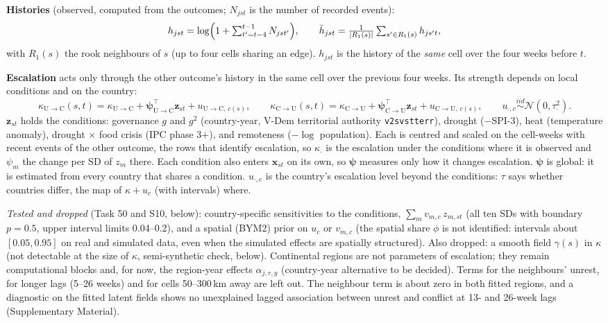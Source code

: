 \documentclass[10pt]{article}
\newcommand{\N}{\mathcal{N}}
\newcommand{\C}{\mathrm{C}}
\newcommand{\U}{\mathrm{U}}
\begin{document}
\textbf{Histories} (observed, computed from the outcomes; $N_{jst}$ is the number of recorded events):
\[
h_{jst} = \log\Bigl(1 + \textstyle\sum_{t'=t-4}^{t-1} N_{jst'}\Bigr), \qquad
\bar h_{jst} = \frac{1}{|R_1(s)|}\sum_{s' \in R_1(s)} h_{js't},
\]
with $R_1(s)$ the rook neighbours of $s$ (up to four cells sharing an edge). $h_{jst}$ is the history
of the \emph{same} cell over the four weeks before $t$.

\textbf{Escalation} acts only through the other outcome's history in the same cell over the previous
four weeks. Its strength depends on local conditions and on the country:
\[
\kappa_{\U\to\C}(s,t) = \kappa_{\U\to\C} + \bm\psi_{\U\to\C}^\top \bm z_{st} + u_{\U\to\C,\,c(s)}, \qquad
\kappa_{\C\to\U}(s,t) = \kappa_{\C\to\U} + \bm\psi_{\C\to\U}^\top \bm z_{st} + u_{\C\to\U,\,c(s)},
\qquad u_{\cdot,c} \overset{iid}{\sim} \N(0, \tau^2_{\cdot}).
\]
$\bm z_{st}$ holds the conditions: governance $g$ and $g^2$ (country-year, V-Dem territorial authority
\texttt{v2svstterr}), drought ($-$SPI-3), heat (temperature anomaly), drought $\times$ food crisis (IPC phase 3+), and
remoteness ($-\log$ population). Each is centred and scaled on the cell-weeks with recent events of the other outcome,
the rows that identify escalation, so $\kappa_{\cdot}$ is the escalation under the conditions where it is observed and
$\psi_m$ the change per SD of $z_m$ there. Each condition also enters $\bm x_{st}$ on its own, so $\bm\psi$ measures
only how it changes escalation. $\bm\psi$ is global: it is estimated from every country that shares a condition.
$u_{\cdot,c}$ is the country's escalation level beyond the conditions: $\tau$ says whether countries differ, the map of
$\kappa + u_c$ (with intervals) where.

\emph{Tested and dropped} (Task 50 and S10, below): country-specific sensitivities to the conditions,
$\sum_m v_{m,c}\, z_{m,st}$ (all ten SDs with boundary $p = 0.5$, upper interval limits 0.04--0.2), and a spatial
(BYM2) prior on $u_c$ or $v_{m,c}$ (the spatial share $\phi$ is not identified: intervals about $[0.05, 0.95]$ on real
and simulated data, even when the simulated effects are spatially structured). Also dropped: a smooth field
$\gamma(s)$ in $\kappa$ (not detectable at the size of $\kappa$, semi-synthetic check, below). Continental regions are
not parameters of escalation; they remain computational blocks and, for now, the region-year effects
$\alpha_{j,r,y}$ (country-year alternative to be decided).
Terms for the neighbours' unrest, for longer lags (5--26 weeks) and for cells 50--300\,km away are
left out. The neighbour term is about zero in both fitted regions, and a diagnostic on the
fitted latent fields shows no unexplained lagged association between unrest and conflict at 13-
and 26-week lags (Supplementary Material).
\end{document}
